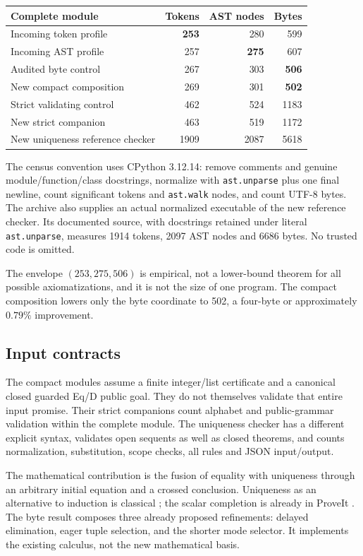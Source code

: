 \documentclass[11pt]{article}
\newcommand{\file}[1]{\nolinkurl{#1}}
\begin{document}
\begin{center}
\begin{tabular}{lrrr}
\toprule
Complete module & Tokens & AST nodes & Bytes\\
\midrule
Incoming token profile & \textbf{253} & 280 & 599\\
Incoming AST profile & 257 & \textbf{275} & 607\\
Audited byte control & 267 & 303 & \textbf{506}\\
New compact composition & 269 & 301 & \textbf{502}\\
Strict validating control & 462 & 524 & 1183\\
New strict companion & 463 & 519 & 1172\\
New uniqueness reference checker & 1909 & 2087 & 5618\\
\bottomrule
\end{tabular}
\end{center}

The census convention uses CPython 3.12.14: remove comments and genuine
module/function/class docstrings, normalize with \file{ast.unparse} plus
one final newline, count significant tokens and \file{ast.walk} nodes,
and count UTF-8 bytes. The archive also supplies an actual normalized
executable of the new reference checker. Its documented source, with
docstrings retained under literal \file{ast.unparse}, measures
1914 tokens, 2097 AST nodes and 6686 bytes. No trusted code is omitted.

The envelope $(253,275,506)$ is empirical, not a lower-bound theorem for
all possible axiomatizations, and it is not the size of one program.
The compact composition lowers only the byte coordinate to 502, a
four-byte or approximately $0.79\%$ improvement.

\subsection{Input contracts}
The compact modules assume a finite integer/list certificate and a
canonical closed guarded Eq/D public goal. They do not themselves
validate that entire input promise. Their strict companions count
alphabet and public-grammar validation within the complete module.
The uniqueness checker has a different explicit syntax, validates open
sequents as well as closed theorems, and counts normalization,
substitution, scope checks, all rules and JSON input/output.

The mathematical contribution is the fusion of equality with uniqueness
through an arbitrary initial equation and a crossed conclusion.
Uniqueness as an alternative to induction is classical
\cite{goodstein,tait}; the scalar completion is already in ProveIt
\cite{ur}. The byte result composes three already proposed refinements:
delayed elimination, eager tuple selection, and the shorter mode selector.
It implements the existing calculus, not the new mathematical basis.
\end{document}
